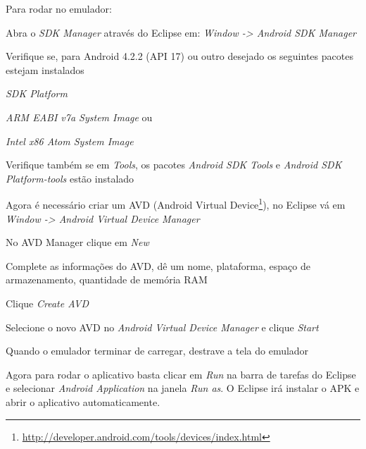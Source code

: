 \documentclass[a4paper,12pt,brazil,doubleside]{book}
\begin{document}
\begin{singlespace}
\newpage 
Para rodar no emulador:
\be
\item Abra o \textit{SDK Manager} através do Eclipse em: \textit{Window -> Android SDK Manager}
\item Verifique se, para Android 4.2.2 (API 17) ou outro desejado os seguintes pacotes estejam instalados
	\bi
	\item \textit{SDK Platform}
	\item \textit{ARM EABI v7a System Image} ou
	\item \textit{Intel x86 Atom System Image}
	\ei
\item Verifique também se em \textit{Tools}, os pacotes \textit{Android SDK Tools} e \textit{Android SDK Platform-tools} estão instalado
\item Agora é necessário criar um AVD (Android Virtual Device\footnote{\href{http://developer.android.com/tools/devices/index.html}{http://developer.android.com/tools/devices/index.html}}), no Eclipse vá em \textit{Window -> Android Virtual Device Manager} 
\item No AVD Manager clique em \emph{New}
\item Complete as informações do AVD, dê um nome, plataforma, espaço de armazenamento, quantidade de memória RAM
\item Clique \emph{Create AVD}
\item Selecione o novo AVD no \textit{Android Virtual Device Manager} e clique \emph{Start}
\item Quando o emulador terminar de carregar, destrave a tela do emulador
\ee

Agora para rodar o aplicativo basta clicar em \emph{Run} na barra de tarefas do Eclipse e selecionar \textit{Android Application} na janela \emph{Run as}. O Eclipse irá instalar o APK e abrir o aplicativo automaticamente.


\end{singlespace}
\end{document}

